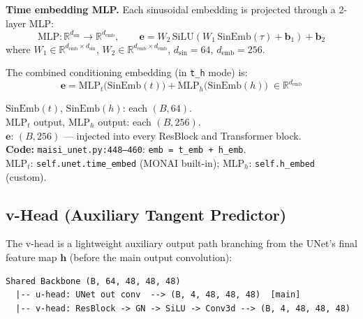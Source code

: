 \documentclass[11pt,a4paper]{article}
\newcommand{\code}[1]{\texttt{#1}}
\begin{document}
\textbf{Time embedding MLP.}  Each sinusoidal embedding is projected through a
2-layer MLP:
\begin{equation}
  \mathrm{MLP}: \mathbb{R}^{d_\mathrm{sin}} \to \mathbb{R}^{d_\mathrm{emb}},
  \qquad
  \mathbf{e} = W_2\,\mathrm{SiLU}(W_1\,\mathrm{SinEmb}(\tau) + \mathbf{b}_1) + \mathbf{b}_2
  \label{eq:time_mlp}
\end{equation}
where $W_1 \in \mathbb{R}^{d_\mathrm{emb} \times d_\mathrm{sin}}$,
$W_2 \in \mathbb{R}^{d_\mathrm{emb} \times d_\mathrm{emb}}$,
$d_\mathrm{sin} = 64$, $d_\mathrm{emb} = 256$.

The combined conditioning embedding (in \code{t\_h} mode) is:
\begin{equation}
  \mathbf{e} = \mathrm{MLP}_t\!\bigl(\mathrm{SinEmb}(t)\bigr)
             + \mathrm{MLP}_h\!\bigl(\mathrm{SinEmb}(h)\bigr)
    \;\in \mathbb{R}^{d_\mathrm{emb}}
  \label{eq:conditioning}
\end{equation}
\begin{shapes}
$\mathrm{SinEmb}(t)$, $\mathrm{SinEmb}(h)$: each $(B, 64)$.\\
$\mathrm{MLP}_t$ output, $\mathrm{MLP}_h$ output: each $(B, 256)$.\\
$\mathbf{e}$: $(B, 256)$ --- injected into every ResBlock and Transformer block.\\
\textbf{Code:} \code{maisi\_unet.py:448--460}:
\code{emb = t\_emb + h\_emb}.\\
$\mathrm{MLP}_t$: \code{self.unet.time\_embed} (MONAI built-in);
$\mathrm{MLP}_h$: \code{self.h\_embed} (custom).
\end{shapes}

\subsection{v-Head (Auxiliary Tangent Predictor)}
\label{sec:vhead_arch}

The v-head is a lightweight auxiliary output path branching from the UNet's
final feature map $\mathbf{h}$ (before the main output convolution):
\begin{center}
\begin{BVerbatim}
Shared Backbone (B, 64, 48, 48, 48)
  |-- u-head: UNet out conv  --> (B, 4, 48, 48, 48)  [main]
  |-- v-head: ResBlock -> GN -> SiLU -> Conv3d --> (B, 4, 48, 48, 48)
\end{BVerbatim}
\end{center}
\end{document}
